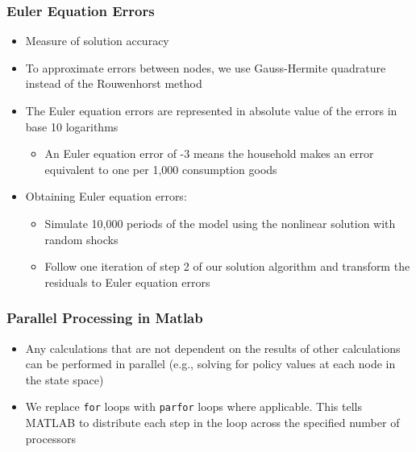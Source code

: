 \documentclass[11pt]{beamer}
\begin{document}
\begin{frame}\frametitle{Euler Equation Errors}
\begin{itemize}\setlength{\itemsep}{8pt}
\item <1-|handout:1>Measure of solution accuracy
\item <2-|handout:1>To approximate errors between nodes, we use Gauss-Hermite quadrature instead of the Rouwenhorst method %
\item <3-|handout:1>The Euler equation errors are represented in absolute value of the errors in base 10 logarithms
\begin{itemize}\setlength{\itemsep}{2pt}
\item An Euler equation error of -3 means the household makes an error equivalent to one per 1,000 consumption goods
\end{itemize}
\item <4-|handout:1>Obtaining Euler equation errors:
\begin{itemize}\setlength{\itemsep}{2pt}
\item Simulate 10,000 periods of the model using the nonlinear solution with random shocks 
\item Follow one iteration of step 2 of our solution algorithm and transform the residuals to Euler equation errors
\end{itemize}
\end{itemize}
\end{frame}



\begin{frame}\frametitle{Parallel Processing in Matlab}

\begin{itemize}\setlength{\itemsep}{14pt}
  \item <1-|handout:1>Any calculations that are not dependent on the results of other calculations can be performed in parallel (e.g., solving for policy values at each node in the state space)
  \item <2-|handout:1>We replace \texttt{for} loops with \texttt{parfor} loops where applicable. This tells MATLAB to distribute each step in the loop across the specified number of processors
\end{itemize}

\end{frame}
\end{document}
